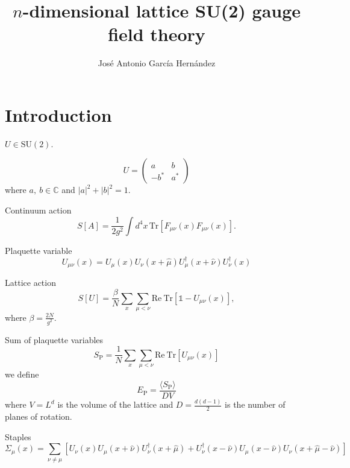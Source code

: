 \documentclass[12pt,a4paper]{article}
\author{José Antonio García Hernández}
\title{$n$-dimensional lattice SU(2) gauge field theory}
\begin{document}
\maketitle
\section{Introduction}
$U \in \text{SU}(2)$.

\begin{equation}
	\label{eq:SU2_element}
	U = \begin{pmatrix}
		a & b \\
		-b^* & a^*
	\end{pmatrix}
\end{equation}
where $a, \ b \in \mathbb{C}$ and $|a|^2 + |b|^2 = 1$.


Continuum action
\begin{equation}
	\label{eq:continuum_action}
	S[A] = \frac{1}{2g^2} \int d^4x \, \text{Tr} \left[ F_{\mu\nu}(x)F_{\mu\nu}(x)\right].
\end{equation} 

Plaquette variable
\begin{equation}
	\label{eq:plaquette}
	U_{\mu\nu}(x) = U_{\mu}(x)U_{\nu}(x+\hat{\mu})U_{\mu}^{\dagger}(x+\hat{\nu})U_{\nu}^{\dagger}(x) 
\end{equation}


Lattice action
\begin{equation}
	\label{eq:wilson_action}
	S[U] = \frac{\beta}{N}\sum_x \sum_{\mu < \nu} \text{Re}\ \text{Tr} \left[\mathds{1} - U_{\mu\nu}(x) \right],
\end{equation}
where $\beta = \frac{2N}{g^2}$.

Sum of plaquette variables
\begin{equation}
	\label{eq:Sp}
	S_{\text{P}} = \frac{1}{N} \sum_x\sum_{\mu < \nu} \text{Re}\ \text{Tr} [U_{\mu\nu}(x)]
\end{equation}
we define
\begin{equation}
	\label{eq:Ep}
	E_{\text{P}} =\frac{ \langle S_{\text{P}} \rangle}{D V}
\end{equation}
where $V=L^d$ is the volume of the lattice and $D = \frac{d(d-1)}{2}$ is the number of planes of rotation.

Staples
\begin{equation}
	\label{eq:staples}
	\Sigma_{\mu}(x) = \sum_{\nu \neq \mu} \left[ U_{\nu}(x)U_{\mu}(x+\hat{\nu})U_{\nu}^{\dagger}(x+\hat{\mu}) + U_{\nu}^{\dagger}(x-\hat{\nu})U_{\mu}(x-\hat{\nu})U_{\nu}(x+\hat{\mu}-\hat{\nu})\right]
\end{equation}
\end{document}
